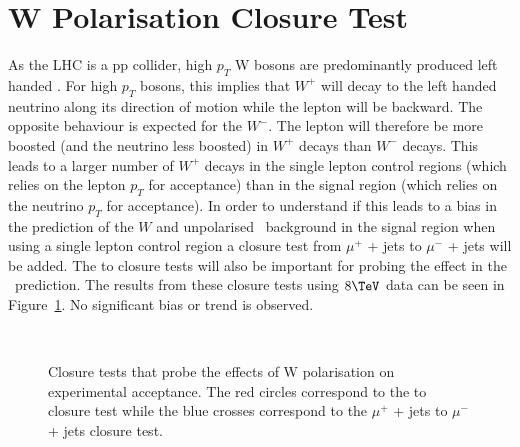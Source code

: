 \clearpage
\section{W Polarisation Closure Test\label{app:wpol}}

As the LHC is a pp collider, high $p_T$ W bosons are predominantly
produced left handed \cite{WPol}.  For high $p_T$ bosons, this implies
that $W^+$ will decay to the left handed neutrino along its direction
of motion while the lepton will be backward. The opposite behaviour is
expected for the $W^-$. The lepton will therefore be more boosted (and
the neutrino less boosted) in $W^+$ decays than $W^-$ decays.  This
leads to a larger number of $W^+$ decays in the single lepton control
regions (which relies on the lepton $p_T$ for acceptance) than in the
signal region (which relies on the neutrino $p_T$ for acceptance). In
order to understand if this leads to a bias in the prediction of the
$W$ and unpolarised \zInv\ background in the signal region when using
a single lepton control region a closure test from $\mu^+$ + jets to
$\mu^-$ + jets will be added.  The \mj to \mmj closure tests will also
be important for probing the effect in the \zInv\ prediction. The
results from these closure tests using $8\TeV$ data can be seen in
Figure~\ref{fig:wpolCT}.  No significant bias or trend is observed.

\begin{figure}[h!]
 \begin{center}  
   ~~
  \caption{Closure tests that probe the effects of W polarisation on
    experimental acceptance. The red circles correspond to the \mj to
    \mmj closure test while the blue crosses correspond to the
    $\mu^+$ + jets to $\mu^-$ + jets closure test.}
  \label{fig:wpolCT}
 \end{center}
\end{figure}          

